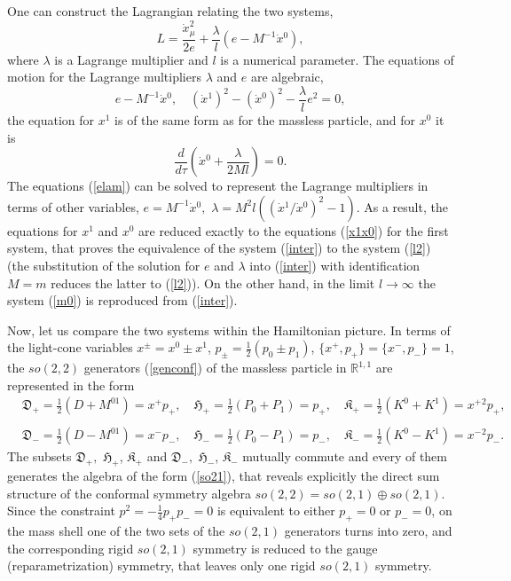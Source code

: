 \documentclass[a4paper,12pt]{article}
\def\R{\mathbb R}
\def\K{\mathfrak K}
\def\D{\mathfrak D}
\def\H{\mathfrak H}
\begin{document}
One can construct the Lagrangian
relating the two systems,
\begin{equation}
L=\frac{\dot{x}_\mu^{2}}{2e}
+\frac{\lambda}{l}(e-M^{-1}\dot{x}{}^0),
\label{inter}
\end{equation}
where $\lambda$ is a Lagrange multiplier
and $l$ is a numerical parameter.
The equations of motion for the  Lagrange multipliers
$\lambda$ and $e$
are algebraic,
\begin{equation}
e-M^{-1}\dot{x}{}^0,\quad
(\dot{x}{}^1)^2-(\dot{x}{}^0)^2-\frac{\lambda}{l}e^2=0,
\label{elam}
\end{equation}
the equation for $x^1$
is of the same form as for the massless particle,
and for $x^0$ it is
\[
\frac{d}{d\tau}
\left(
\dot{x}{}^0+\frac{\lambda}{2Ml}\right)=0.
\]
The equations (\ref{elam})
can be solved to represent the
Lagrange multipliers in terms of other
variables,
$
e=M^{-1}\dot{x}{}^0,
$
$
\lambda=M^2 l(({\dot{x}{}^1}/\dot{x}{}^0)^2-1).
$
As a result,
the equations
for $x^1$ and $x^0$
are reduced exactly
to the equations (\ref{x1x0}) for the first system,
that proves the equivalence of the system
(\ref{inter}) to the system (\ref{l2})
(the substitution of the solution for $e$ and $\lambda$
into (\ref{inter}) with identification $M=m$
reduces the latter to (\ref{l2})).
On the other hand,
in the limit $l\rightarrow \infty$
the system (\ref{m0}) is
reproduced from (\ref{inter}).

Now, let us compare the two systems within the
Hamiltonian picture.
In terms of the
light-cone variables $x^\pm=x^0\pm x^1$,
 $p_\pm=\frac{1}{2}(p_0\pm p_1)$,
 $\{x^+,p_+\}=\{x^-,p_-\}=1$,
the $so(2,2)$
generators (\ref{genconf})
of the massless particle in $\R^{1,1}$
are represented in the form
\begin{eqnarray}
& \D_+=\frac{1}{2}(D+M^{01})=x^+p_+,\quad
\H_+=\frac{1}{2}( P_0+P_1)=p_+,\quad
 \K_+=\frac{1}{2}(K^0+K^1)=x^+{}^2p_+,
&\nonumber\\
&&\label{gen+-}
\\
&
\D_-= \frac{1}{2}(D-M^{01})=x^-p_-,\quad
\H_-=\frac{1}{2} (P_0-P_1)=p_-,\quad
\K_-=\frac{1}{2}(K^0-K^1)=x^-{}^2p_-.
&
\nonumber
\end{eqnarray}
The subsets
$\D_+,$ $\H_+$, $\K_+$
and $\D_-,$ $\H_-$, $\K_-$
mutually commute and every
of them generates
the algebra of the form (\ref{so21}), that
reveals explicitly the direct sum structure of the conformal
symmetry algebra
 $so(2,2)=so(2,1)\oplus so(2,1)$.
Since the constraint
$p^2=-\frac{1}{4}p_+p_-=0$ is equivalent to either
$p_+=0$ or $p_-=0$, on the mass shell
one of the two sets of the $so(2,1)$ generators
turns into zero, and
the corresponding
rigid $so(2,1)$ symmetry is reduced to
the gauge (reparametrization) symmetry,
that leaves only one rigid $so(2,1)$ symmetry.
\end{document}
